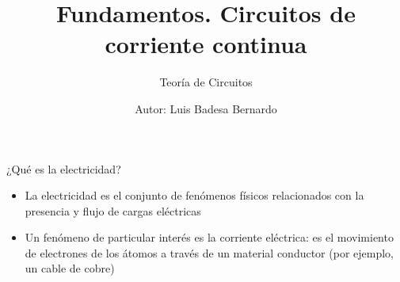 \documentclass[aspectratio=169, xcolor={usenames,svgnames,dvipsnames}]{beamer}
\author{Autor: \hspace{2mm} Luis Badesa Bernardo}
\date{}
\title{Fundamentos. Circuitos de corriente continua \vspace{3mm}}
\subtitle{Teoría de Circuitos}
\begin{document}
\maketitle


\begin{frame}{¿Qué es la electricidad?}
    \begin{itemize}
        \item La electricidad es el conjunto de fenómenos físicos relacionados con la \alert{presencia y flujo} de \alert{cargas eléctricas}

        \vspace{8mm}
        
        \item Un fenómeno de particular interés es la \alert{corriente eléctrica}: es el movimiento de electrones de los átomos a través de un material conductor (por ejemplo, un cable de cobre) 
    \end{itemize}
\end{frame}

\end{document}

